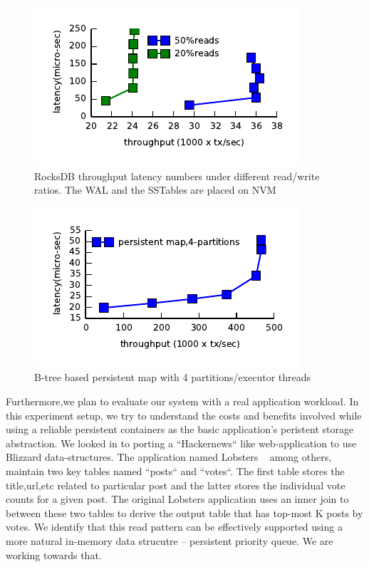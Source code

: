 \begin{figure}[tbp]   
	\centering
	\includegraphics[width=\linewidth]{plot/rocksdbcompare.pdf} 
	\caption{\small RocksDB throughput latency numbers under different read/write ratios. The WAL and the SSTables are placed on NVM} 
	\label{fig:pmemkv} 
\end{figure}

\begin{figure}[tbp]   
	\centering
	\includegraphics[width=\linewidth]{plot/bliztree-partition.pdf} 
	\caption{\small B-tree based persistent map with 4 partitions/executor threads} 
	\label{fig:pmemkv} 
\end{figure}

Furthermore,we plan to evaluate our system with a real application workload. In this experiment setup, we try to understand the costs
and benefits involved while using a reliable persistent containers as the basic application's peristent storage abstraction.
We looked in to porting a ``Hackernews`` like web-application to use Blizzard data-structures. The application named Lobsters
~\cite{lobsters} among others, maintain two key tables named ``posts`` and ``votes``. The first table stores the 
title,url,etc related to particular post and the latter stores the individual vote counts for a given post. The original
Lobsters application uses an inner join to between these two tables to derive the output table that has top-most K posts
by votes. We identify that this read pattern can be effectively supported using a more natural in-memory data strucutre --
persistent priority queue. We are working towards that.


